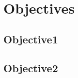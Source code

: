 
%
%

\chapter{Objectives}
\label{chapter:objectives}



\section{Objective1}



\section{Objective2}

